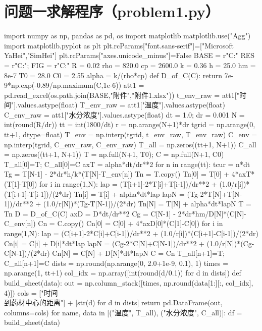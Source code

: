 \section{问题一求解程序（problem1.py）}
\begin{codelisting}
import numpy as np, pandas as pd, os
import matplotlib
matplotlib.use("Agg")
import matplotlib.pyplot as plt
plt.rcParams["font.sans-serif"]=["Microsoft YaHei","SimHei"]
plt.rcParams["axes.unicode_minus"]=False
BASE = r"C:\Users{}\Desktop{}"
RES  = r"C:\Users{}\Desktop\A{}"; FIG = r"C:\Users{}\Desktop\A\图"
R   = 0.02
rho = 820.0
cp  = 2600.0
k   = 0.36
h   = 25.0
hm  = 8e-7
T0  = 28.0
C0  = 2.55
alpha = k/(rho*cp)
def D_of_C(C):
    return 7e-9*np.exp(-0.89/np.maximum(C,1e-6))
att1 = pd.read_excel(os.path.join(BASE,"附件","附件1.xlsx"))
t_env_raw = att1["时间"].values.astype(float)
T_env_raw = att1["温度"].values.astype(float)
C_env_raw = att1["水分浓度"].values.astype(float)
dt = 1.0; dr = 0.001
N  = int(round(R/dr))
tt = int(1800/dt)
r  = np.arange(N+1)*dr
tgrid = np.arange(0, tt+1, dtype=float)
T_env = np.interp(tgrid, t_env_raw, T_env_raw)
C_env = np.interp(tgrid, C_env_raw, C_env_raw)
T_all = np.zeros((tt+1, N+1))
C_all = np.zeros((tt+1, N+1))
T = np.full(N+1, T0); C = np.full(N+1, C0)
T_all[0]=T; C_all[0]=C
axT = alpha*dt/dr**2
for n in range(tt):
    tcur = n*dt
    Tg = T[N-1] - 2*dr*h/k*(T[N]-T_env[n])
    Tn = T.copy()
    Tn[0] = T[0] + 4*axT*(T[1]-T[0])
    for i in range(1,N):
        lap = (T[i+1]-2*T[i]+T[i-1])/dr**2 + (1.0/r[i])*(T[i+1]-T[i-1])/(2*dr)
        Tn[i] = T[i] + alpha*dt*lap
    lapN = (Tg-2*T[N]+T[N-1])/dr**2 + (1.0/r[N])*(Tg-T[N-1])/(2*dr)
    Tn[N] = T[N] + alpha*dt*lapN
    T = Tn
    D = D_of_C(C)
    axD = D*dt/dr**2
    Cg = C[N-1] - 2*dr*hm/D[N]*(C[N]-C_env[n])
    Cn = C.copy()
    Cn[0] = C[0] + 4*axD[0]*(C[1]-C[0])
    for i in range(1,N):
        lap = (C[i+1]-2*C[i]+C[i-1])/dr**2 + (1.0/r[i])*(C[i+1]-C[i-1])/(2*dr)
        Cn[i] = C[i] + D[i]*dt*lap
    lapN = (Cg-2*C[N]+C[N-1])/dr**2 + (1.0/r[N])*(Cg-C[N-1])/(2*dr)
    Cn[N] = C[N] + D[N]*dt*lapN
    C = Cn
    T_all[n+1]=T; C_all[n+1]=C
dists = np.round(np.arange(0, 2.0+1e-9, 0.1), 1)
times = np.arange(1, tt+1)
col_idx = np.array([int(round(d/0.1)) for d in dists])
def build_sheet(data):
    out = np.column_stack([times, np.round(data[1:][:, col_idx], 4)])
    cols = ["时间\\到药材中心的距离"] + [str(d) for d in dists]
    return pd.DataFrame(out, columns=cols)
for name, data in [("温度", T_all), ("水分浓度", C_all)]:
    df = build_sheet(data)

\end{codelisting}
